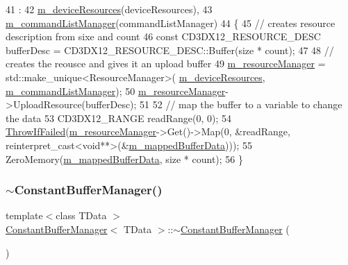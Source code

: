\begin{DoxyCode}
41                                                                 :
42     \mbox{\hyperlink{class_constant_buffer_manager_a9514f5810d4492698ed04c48e67ef7e0}{m\_deviceResources}}(deviceResources),
43     \mbox{\hyperlink{class_constant_buffer_manager_aae03042ae999bf171e8dcffefdd4be63}{m\_commandListManager}}(commandListManager)
44 \{
45     \textcolor{comment}{// creates resource description from sixe and count}
46     \textcolor{keyword}{const} CD3DX12\_RESOURCE\_DESC bufferDesc = CD3DX12\_RESOURCE\_DESC::Buffer(size * count);
47 
48     \textcolor{comment}{// creates the reousce and gives it an upload buffer}
49     \mbox{\hyperlink{class_constant_buffer_manager_a8302ee559cb53baaf2233fcb20b867b4}{m\_resourceManager}} = std::make\_unique<ResourceManager>(
      \mbox{\hyperlink{class_constant_buffer_manager_a9514f5810d4492698ed04c48e67ef7e0}{m\_deviceResources}}, \mbox{\hyperlink{class_constant_buffer_manager_aae03042ae999bf171e8dcffefdd4be63}{m\_commandListManager}});
50     \mbox{\hyperlink{class_constant_buffer_manager_a8302ee559cb53baaf2233fcb20b867b4}{m\_resourceManager}}->UploadResource(bufferDesc);
51 
52     \textcolor{comment}{// map the buffer to a variable to change the data}
53     CD3DX12\_RANGE readRange(0, 0);
54     \mbox{\hyperlink{_direct_x_helper_8h_abca3eeca6b5772a1112e0a9a9e3d9013}{ThrowIfFailed}}(\mbox{\hyperlink{class_constant_buffer_manager_a8302ee559cb53baaf2233fcb20b867b4}{m\_resourceManager}}->Get()->Map(0, &readRange, 
      reinterpret\_cast<void**>(&\mbox{\hyperlink{class_constant_buffer_manager_a35b50fb75b21a3b98adca908b5c144c6}{m\_mappedBufferData}})));
55     ZeroMemory(\mbox{\hyperlink{class_constant_buffer_manager_a35b50fb75b21a3b98adca908b5c144c6}{m\_mappedBufferData}}, size * count);
56 \}
\end{DoxyCode}
\mbox{\label{class_constant_buffer_manager_a837ca267d583694e3641997f0b611b30}} 
\subsubsection{\texorpdfstring{$\sim$\+Constant\+Buffer\+Manager()}{~ConstantBufferManager()}}
{\footnotesize\ttfamily template$<$class T\+Data $>$ \\
\mbox{\hyperlink{class_constant_buffer_manager}{Constant\+Buffer\+Manager}}$<$ T\+Data $>$\+::$\sim$\mbox{\hyperlink{class_constant_buffer_manager}{Constant\+Buffer\+Manager}} (\begin{DoxyParamCaption}{ }\end{DoxyParamCaption})}



